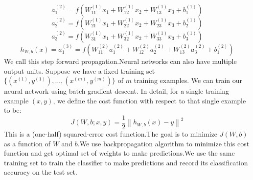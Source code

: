\documentclass[18pt,letterpaper]{article}
\begin{document}
$$a_1^{(2)} = f(W_{11}^{(1)}x_1 + W_{12}^{(1)} x_2 + W_{13}^{(1)} x_3 + b_1^{(1)})$$
$$a_2^{(2)} = f(W_{21}^{(1)}x_1 + W_{22}^{(1)} x_2 + W_{23}^{(1)} x_3 + b_2^{(1)})$$
$$ a_3^{(2)} = f(W_{31}^{(1)}x_1 + W_{32}^{(1)} x_2 + W_{33}^{(1)} x_3 + b_3^{(1)})$$
$$h_{W,b}(x) = a_1^{(3)} =  f(W_{11}^{(2)}a_1^{(2)} + W_{12}^{(2)} a_2^{(2)} + W_{13}^{(2)} a_3^{(2)} + b_1^{(2)})$$
We call this step forward propagation.Neural networks can also have multiple output units.
Suppose we have a fixed training set $\{ (x^{(1)}, y^{(1)}), \ldots, (x^{(m)}, y^{(m)}) \}$ of $m$ training examples. We can train our neural network using batch gradient descent. In detail, for a single training example $(x,y)$, we define the cost function with respect to that single example to be:
$$ J(W,b; x,y) = \frac{1}{2} \left\| h_{W,b}(x) - y \right\|^2$$
This is a (one-half) squared-error cost function.The goal is to minimize $J(W,b)$ as a function of $W$ and $b$.We use backpropagation algorithm to minimize this cost function and get optimal set of weights to make predictions.We use the same training set to train the classifier to make predictions and record its classification accuracy on the test set.
\end{document}
